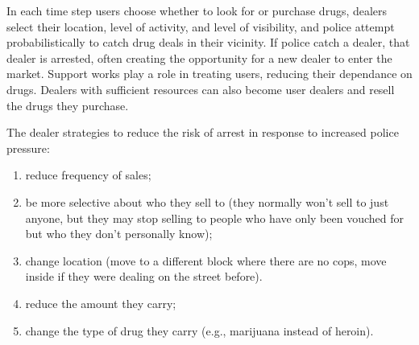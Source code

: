 \documentclass[runningheads,a4paper]{llncs}
\begin{document}
In each time step users choose whether to look for or purchase drugs, dealers select their location, level of activity, and level of visibility, and police attempt probabilistically to catch drug deals in their vicinity. If police catch a dealer, that dealer is arrested, often creating the opportunity for a new dealer to enter the market. Support works play a role in treating users, reducing their dependance on drugs. Dealers with sufficient resources can also become user dealers and resell the drugs they purchase.





%

The dealer strategies to reduce the risk of arrest in response to increased police pressure:

\begin{enumerate}
   \item reduce frequency of sales;
   \item  be more selective about who they sell to (they normally won't sell to just anyone, but they may stop selling to people who have only been vouched for but who they don't personally know);
   \item change location (move to a different block where there are no cops, move inside if they were dealing on the street before).
   \item reduce the amount they carry;
  \item change the type of drug they carry (e.g., marijuana instead of heroin).
\end{enumerate}
\end{document}
